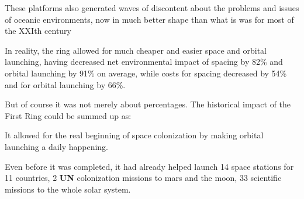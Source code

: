 \documentclass[]{article}
\begin{document}
	These platforms also generated waves of discontent about the problems and issues of oceanic environments, now in much better shape than what is was for most of the XXIth century
	
	
	
	In reality, the ring allowed for much cheaper and easier space and orbital launching, having decreased net environmental impact of spacing by 82\% and orbital launching by 91\% on average, while costs for spacing decreased by 54\% and for orbital launching by 66\%.  
	
	But of course it was not merely about percentages. The historical impact of the First Ring could be summed up as:
	
	\begin{center}
		It allowed for the real beginning of space colonization by making orbital launching a daily happening.  
	\end{center}
	
	Even before it was completed, it had already helped launch 14 space stations for 11 countries, 2 \textbf{UN} colonization missions to mars and the moon, 33 scientific missions to the whole solar system. 
	
	
	
\end{document}
